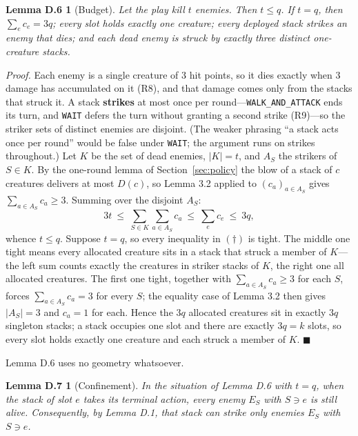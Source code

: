 \documentclass[11pt,a4paper]{article}
\theoremstyle{plain}
\newtheorem*{lembudget}{Lemma D.6}
\newtheorem*{lemconf}{Lemma D.7}
\theoremstyle{definition}
\theoremstyle{plain}
\theoremstyle{definition}
\theoremstyle{remark}
\newcommand{\qedbox}{\hfill$\blacksquare$}
\begin{document}
\begin{lembudget}[Budget]
Let the play kill $t$ enemies. Then $t\le q$. If $t=q$, then $\sum_e c_e=3q$; every slot holds
exactly one creature; every deployed stack strikes an enemy that dies; and each dead enemy is
struck by exactly three distinct one-creature stacks.
\end{lembudget}

\noindent\emph{Proof.} Each enemy is a single creature of 3 hit points, so it dies exactly when 3
damage has accumulated on it (R8), and that damage comes only from the stacks that struck it. A
stack \textbf{strikes} at most once per round---\texttt{WALK\_AND\_ATTACK} ends its turn, and
\texttt{WAIT} defers the turn without granting a second strike (R9)---so the striker sets of
distinct enemies are disjoint. (The weaker phrasing ``a stack acts once per round'' would be
false under \texttt{WAIT}; the argument runs on strikes throughout.) Let $K$ be the set of dead
enemies, $|K|=t$, and $A_S$ the strikers of $S\in K$. By the one-round lemma of
Section~\ref{sec:policy} the blow of a stack of $c$ creatures delivers at most $D(c)$, so
Lemma 3.2 applied to $(c_a)_{a\in A_S}$ gives $\sum_{a\in A_S}c_a\ge 3$. Summing over the
disjoint $A_S$:
\begin{equation*}
  3t\ \le\ \sum_{S\in K}\sum_{a\in A_S}c_a\ \le\ \sum_e c_e\ \le\ 3q,
  \tag{$\dagger$}
\end{equation*}
whence $t\le q$. Suppose $t=q$, so every inequality in $(\dagger)$ is tight. The middle one tight
means every allocated creature sits in a stack that struck a member of $K$---the left sum counts
exactly the creatures in striker stacks of $K$, the right one all allocated creatures. The first
one tight, together with $\sum_{a\in A_S}c_a\ge 3$ for each $S$, forces $\sum_{a\in A_S}c_a=3$
for every $S$; the equality case of Lemma 3.2 then gives $|A_S|=3$ and $c_a=1$ for each. Hence
the $3q$ allocated creatures sit in exactly $3q$ singleton stacks; a stack occupies one slot and
there are exactly $3q=k$ slots, so every slot holds exactly one creature and each struck a member
of $K$. \qedbox

\smallskip
Lemma D.6 uses no geometry whatsoever.

\begin{lemconf}[Confinement]
In the situation of Lemma D.6 with $t=q$, when the stack of slot $e$ takes its terminal action,
every enemy $E_S$ with $S\ni e$ is still alive. Consequently, by Lemma D.1, that stack can strike
only enemies $E_S$ with $S\ni e$.
\end{lemconf}
\end{document}
